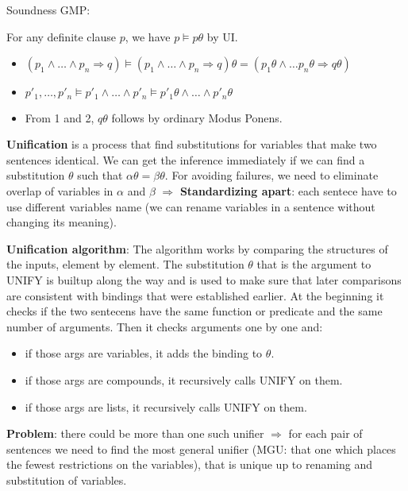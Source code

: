 \documentclass[12pt]{article}
\begin{document}
\begin{enumerate}[label=\textbf{FOL.\arabic*}]
    Soundness GMP:

    For any definite clause $p$, we have $p\vDash p\theta$ by UI.
    \begin{itemize}
        \item $(p_1\land\ldots\land p_n \Rightarrow q)\vDash(p_1\land\ldots\land p_n \Rightarrow q)\theta=(p_1\theta\land\ldots p_n\theta\Rightarrow q\theta)$
        \item $p'_1,\ldots, p'_n \vDash p'_1\land\ldots\land p'_n\vDash p'_1\theta\land\ldots\land p'_n\theta$
        \item From 1 and 2, $q\theta$ follows by ordinary Modus Ponens.
    \end{itemize}

    \textbf{Unification} is a process that find substitutions for variables that make two sentences identical.
    We can get the inference immediately if we can find a substitution $\theta$ such that $\alpha\theta = \beta\theta$.
    For avoiding failures, we need to eliminate overlap of variables in $\alpha$ and $\beta$ $\Rightarrow$ \textbf{Standardizing apart}:
    each sentece have to use different variables name (we can rename variables in a sentence without changing its meaning).

    \textbf{Unification algorithm}:
    The algorithm works by comparing the structures of the inputs, element by element.
    The substitution $\theta$ that is the argument to UNIFY is builtup along the way and is used to make sure that later comparisons are consistent with bindings that were established earlier.
    At the beginning it checks if the two sentecens have the same function or predicate and the same number of arguments.
    Then it checks arguments one by one and:
    \begin{itemize}
        \item if those args are variables, it adds the binding to $\theta$.
        \item if those args are compounds, it recursively calls UNIFY on them.
        \item if those args are lists, it recursively calls UNIFY on them.
    \end{itemize}

    \textbf{Problem}: there could be more than one such unifier $\Rightarrow$ for each pair of sentences we need to find the most general unifier
    (MGU\@: that one which places the fewest restrictions on the variables), 
    that is unique up to renaming and substitution of variables.


\end{enumerate}
\end{document}
